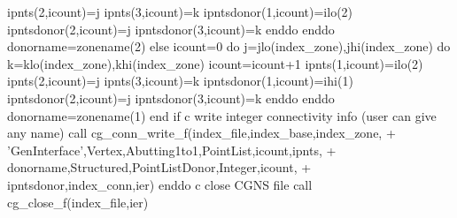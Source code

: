 \documentclass[12pt]{article}
\begin{document}
{\newline\indent\indent\indent\indent\indent       ipnts(2,icount)=j
\newline\indent\indent\indent\indent\indent       ipnts(3,icount)=k
\newline\indent\indent\indent\indent\indent       ipntsdonor(1,icount)=ilo(2)
\newline\indent\indent\indent\indent\indent       ipntsdonor(2,icount)=j
\newline\indent\indent\indent\indent\indent       ipntsdonor(3,icount)=k
\newline\indent\indent\indent\indent     enddo
\newline\indent\indent\indent   enddo
\newline\indent\indent\indent      donorname=zonename(2)
\newline\indent\indent   else
\newline\indent\indent\indent   icount=0
\newline\indent\indent\indent   do j=jlo(index\_zone),jhi(index\_zone)
\newline\indent\indent\indent\indent     do k=klo(index\_zone),khi(index\_zone)
\newline\indent\indent\indent\indent\indent       icount=icount+1
\newline\indent\indent\indent\indent\indent       ipnts(1,icount)=ilo(2)
\newline\indent\indent\indent\indent\indent       ipnts(2,icount)=j
\newline\indent\indent\indent\indent\indent       ipnts(3,icount)=k
\newline\indent\indent\indent\indent\indent       ipntsdonor(1,icount)=ihi(1)
\newline\indent\indent\indent\indent\indent       ipntsdonor(2,icount)=j
\newline\indent\indent\indent\indent\indent       ipntsdonor(3,icount)=k
\newline\indent\indent\indent\indent     enddo
\newline\indent\indent\indent   enddo
\newline\indent\indent\indent      donorname=zonename(1)
\newline\indent\indent   end if
\newline c   write integer connectivity info (user can give any name)
\newline\indent\indent   call cg\_conn\_write\_f(index\_file,index\_base,index\_zone,
\newline\indent + \indent 'GenInterface',Vertex,Abutting1to1,PointList,icount,ipnts,
\newline\indent + \indent donorname,Structured,PointListDonor,Integer,icount,
\newline\indent + \indent ipntsdonor,index\_conn,ier)
\newline\indent      enddo
\newline c  close CGNS file
\newline\indent      call cg\_close\_f(index\_file,ier)}
\end{document}
